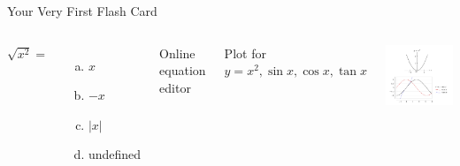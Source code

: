 \documentclass{beamer}
\begin{document}
\begin{frame}[t]{Your Very First Flash Card}\vspace{10pt}
  \begin{columns}
    $\sqrt{x^2}=$\\[0pt]
    \begin{enumerate}[(a)]
      \item $x$
      \item $-x$
      \item $|x|$
      \item undefined
    \end{enumerate}  \vspace{40pt}
    \tiny{Online equation editor} 
    \href{https://latex.codecogs.com/legacy/eqneditor/editor.php}{}  
    \\[15pt]
    \begin{center}
      Plot for \\
      $ y = x^2, \sin x, \cos x, \tan x$
    \end{center}
    \includegraphics[scale=0.16]{../../img/graph.png}
  \end{columns}  
\end{frame}

    
\end{document}
